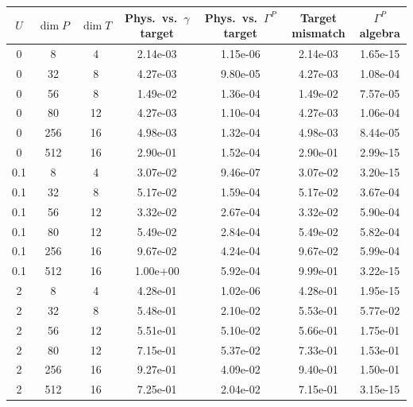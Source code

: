\begin{tabular}{ccccccc}
\hline
$U$ & $\dim P$ & $\dim T$ & Phys.\ vs.\ $\gamma$ target & Phys.\ vs.\ $\Gamma^P$ target & Target mismatch & $\Gamma^P$ algebra \\
\hline
0 & 8 & 4 & 2.14e-03 & 1.15e-06 & 2.14e-03 & 1.65e-15 \\
0 & 32 & 8 & 4.27e-03 & 9.80e-05 & 4.27e-03 & 1.08e-04 \\
0 & 56 & 8 & 1.49e-02 & 1.36e-04 & 1.49e-02 & 7.57e-05 \\
0 & 80 & 12 & 4.27e-03 & 1.10e-04 & 4.27e-03 & 1.06e-04 \\
0 & 256 & 16 & 4.98e-03 & 1.32e-04 & 4.98e-03 & 8.44e-05 \\
0 & 512 & 16 & 2.90e-01 & 1.52e-04 & 2.90e-01 & 2.99e-15 \\
\hline
0.1 & 8 & 4 & 3.07e-02 & 9.46e-07 & 3.07e-02 & 3.20e-15 \\
0.1 & 32 & 8 & 5.17e-02 & 1.59e-04 & 5.17e-02 & 3.67e-04 \\
0.1 & 56 & 12 & 3.32e-02 & 2.67e-04 & 3.32e-02 & 5.90e-04 \\
0.1 & 80 & 12 & 5.49e-02 & 2.84e-04 & 5.49e-02 & 5.82e-04 \\
0.1 & 256 & 16 & 9.67e-02 & 4.24e-04 & 9.67e-02 & 5.99e-04 \\
0.1 & 512 & 16 & 1.00e+00 & 5.92e-04 & 9.99e-01 & 3.22e-15 \\
\hline
2 & 8 & 4 & 4.28e-01 & 1.02e-06 & 4.28e-01 & 1.95e-15 \\
2 & 32 & 8 & 5.48e-01 & 2.10e-02 & 5.53e-01 & 5.77e-02 \\
2 & 56 & 12 & 5.51e-01 & 5.10e-02 & 5.66e-01 & 1.75e-01 \\
2 & 80 & 12 & 7.15e-01 & 5.37e-02 & 7.33e-01 & 1.53e-01 \\
2 & 256 & 16 & 9.27e-01 & 4.09e-02 & 9.40e-01 & 1.50e-01 \\
2 & 512 & 16 & 7.25e-01 & 2.04e-02 & 7.15e-01 & 3.15e-15 \\
\hline
\end{tabular}
